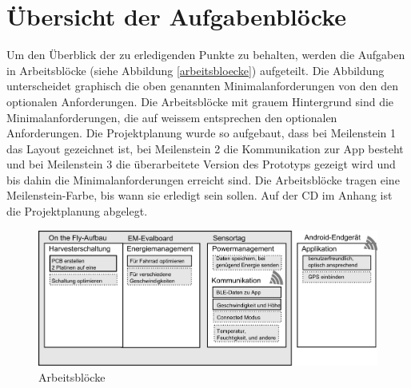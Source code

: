 \section{Übersicht der Aufgabenblöcke}

Um den Überblick der zu erledigenden Punkte zu behalten, werden die Aufgaben in Arbeitsblöcke (siehe Abbildung \ref{arbeitsbloecke}) aufgeteilt. Die Abbildung unterscheidet graphisch die oben genannten Minimalanforderungen von den den optionalen Anforderungen. Die Arbeitsblöcke mit grauem Hintergrund sind die Minimalanforderungen, die auf weissem entsprechen den optionalen Anforderungen. Die Projektplanung wurde so aufgebaut, dass bei Meilenstein 1 das Layout gezeichnet ist, bei Meilenstein 2 die Kommunikation zur App besteht und bei Meilenstein 3 die überarbeitete Version des Prototyps gezeigt wird und bis dahin die Minimalanforderungen erreicht sind. Die Arbeitsblöcke tragen eine Meilenstein-Farbe, bis wann sie erledigt sein sollen. Auf der CD im Anhang ist die Projektplanung abgelegt.


\begin{figure}[ht]
    \includegraphics[width=1.0\textwidth]{../ressources/Projektorganisation/Arbeitsbloecke.png} 
    \caption{Arbeitsblöcke}
\end{figure}\label{arbeitsbloecke} 


